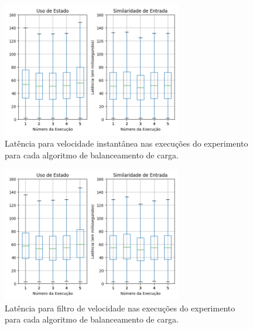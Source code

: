 
 \afterpage{\clearpage}

\begin{figure}[ht]
\centering
 \includegraphics[width=0.7\textwidth]{figuras/graphics/boxplot_agg_vf.png}
 \caption{Latência para velocidade instantânea nas execuções do experimento para cada algoritmo de balanceamento de carga.}
 \label{fig:boxplot_vf_agg_1}
\end{figure}

\afterpage{\clearpage}

\begin{figure}[ht]
  \centering
\includegraphics[width=0.7\textwidth]{figuras/graphics/boxplot_agg_vi.png}
\caption{Latência para filtro de velocidade nas execuções do experimento para cada algoritmo de balanceamento de carga.}
\label{fig:boxplot_vi_agg_1}
\end{figure}

